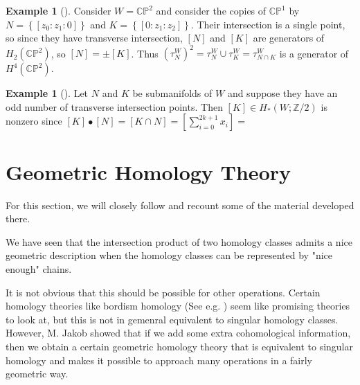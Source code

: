 \documentclass[reqno]{amsart}
\theoremstyle{definition}
\newtheorem{example}[theorem]{Example}
\theoremstyle{remark}
\begin{document}
      \begin{example}[]
          Consider $W = \mathbb{C}\mathbb{P}^2$ and
          consider the copies
          of $\mathbb{C}\mathbb{P}^{1}$ by
          $N = \left\{ \left[ z_0: z_1 : 0 \right]  \right\} $ and
          $K = \left\{ \left[ 0 : z_1 : z_2 \right]  \right\} $.
          Their intersection is a single point, so
          since they have transverse intersection,
          $\left[ N \right] $ and
          $\left[ K \right] $ are generators of
          $H_2\left( \mathbb{C}\mathbb{P}^2 \right) $, so
          $\left[ N \right] = \pm \left[ K \right] $.
           Thus $\left( \tau_N^{W} \right)^2 = 
           \tau_N^{W} \cup \tau_K^{W} = 
           \tau_{N \cap K}^{W}$ is a generator
           of $H^{4}\left( \mathbb{C}\mathbb{P}^2 \right) $.
      \end{example}

      \begin{example}[]
          Let $N$ and $K$ be submanifolds of
          $W$ and suppose they have an odd number of transverse
          intersection points. Then
          $\left[ K \right] \in H_* \left( W; \mathbb{Z}/2 \right) $ is
          nonzero since
          $\left[ K \right] \bullet  \left[ N \right] 
          = \left[ K \cap N \right] = 
          \left[ \sum_{i=0}^{2k+1} x_i \right] 
          = $
      \end{example}


















\newpage



\section{Geometric Homology Theory}

For this section, we will closely follow \cite{Chataur} and
recount some of the material developed there.\\
\linebreak


We have seen that the intersection product of two homology classes
admits a nice geometric description when the homology classes can be
represented by "nice enough" chains.


It is not obvious that this should be possible
for other operations. 
Certain homology theories like bordism homology (See e.g. \cite{Dieck})
seem like promising theories to look at, but
this is not in gemenral equivalent
to singular homology classes.
However, M. Jakob showed that if we add
some extra cohomological information, then
we obtain a certain geometric homology theory that is equivalent
to singular homology and
 makes it possible to approach
many operations in a fairly geometric way.
\end{document}
